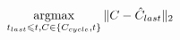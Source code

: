 \begin{equation}\label{eq:splining_traj_selection}
  \operatorname*{argmax}_{t_{last} \leqslant t, C \in \{C_{cycle},t\}} \Vert C - \hat{C}_{last} \Vert_{2} 
\end{equation}	

